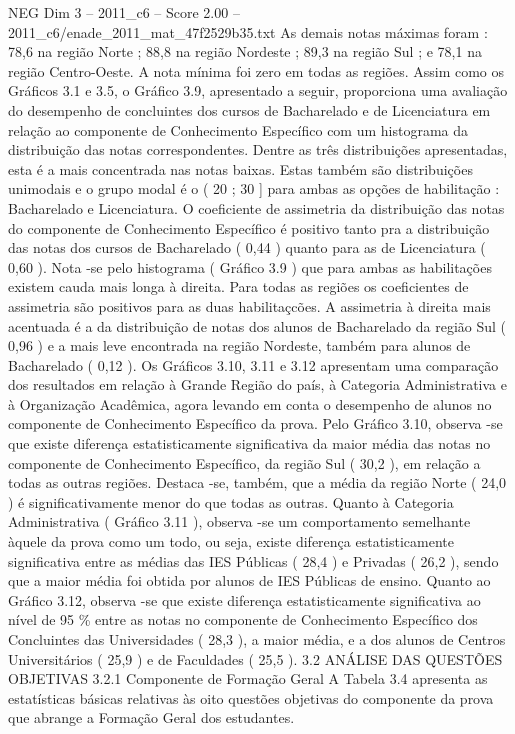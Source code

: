 \begin{textsample}{NEG Dim 3 – 2011\_c6 – Score 2.00 – 2011\_c6/enade\_2011\_mat\_47f2529b35.txt}
As demais notas máximas foram : 78,6 na região Norte ; 88,8 na região Nordeste ; 89,3 na região Sul ; e 78,1 na região Centro-Oeste.
A nota mínima foi zero em todas as regiões.
Assim como os Gráficos 3.1 e 3.5, o Gráfico 3.9, apresentado a seguir, proporciona uma avaliação do desempenho de concluintes dos cursos de Bacharelado e de Licenciatura em relação ao componente de Conhecimento Específico com um histograma da distribuição das notas correspondentes.
Dentre as três distribuições apresentadas, esta é a mais concentrada nas notas baixas.
Estas também são distribuições unimodais e o grupo modal é o ( 20 ; 30 ] para ambas as opções de habilitação : Bacharelado e Licenciatura.
O coeficiente de assimetria da distribuição das notas do componente de Conhecimento Específico é positivo tanto pra a distribuição das notas dos cursos de Bacharelado ( 0,44 ) quanto para as de Licenciatura ( 0,60 ).
Nota -se pelo histograma ( Gráfico 3.9 ) que para ambas as habilitações existem cauda mais longa à direita.
Para todas as regiões os coeficientes de assimetria são positivos para as duas habilitaçcões.
A assimetria à direita mais acentuada é a da distribuição de notas dos alunos de Bacharelado da região Sul ( 0,96 ) e a mais leve encontrada na região Nordeste, também para alunos de Bacharelado ( 0,12 ).
Os Gráficos 3.10, 3.11 e 3.12 apresentam uma comparação dos resultados em relação à Grande Região do país, à Categoria Administrativa e à Organização Acadêmica, agora levando em conta o desempenho de alunos no componente de Conhecimento Específico da prova.
Pelo Gráfico 3.10, observa -se que existe diferença estatisticamente significativa da maior média das notas no componente de Conhecimento Específico, da região Sul ( 30,2 ), em relação a todas as outras regiões.
Destaca -se, também, que a média da região Norte ( 24,0 ) é significativamente menor do que todas as outras.
Quanto à Categoria Administrativa ( Gráfico 3.11 ), observa -se um comportamento semelhante àquele da prova como um todo, ou seja, existe diferença estatisticamente significativa entre as médias das IES Públicas ( 28,4 ) e Privadas ( 26,2 ), sendo que a maior média foi obtida por alunos de IES Públicas de ensino.
Quanto ao Gráfico 3.12, observa -se que existe diferença estatisticamente significativa ao nível de 95 \% entre as notas no componente de Conhecimento Específico dos Concluintes das Universidades ( 28,3 ), a maior média, e a dos alunos de Centros Universitários ( 25,9 ) e de Faculdades ( 25,5 ). 3.2 ANÁLISE DAS QUESTÕES OBJETIVAS 3.2.1 Componente de Formação Geral A Tabela 3.4 apresenta as estatísticas básicas relativas às oito questões objetivas do componente da prova que abrange a Formação Geral dos estudantes.

\end{textsample}
